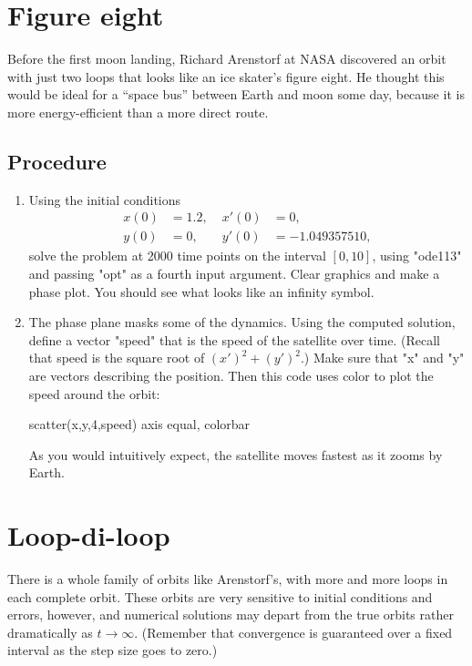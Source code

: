 \documentclass[11pt,twoside]{article}
\begin{document}
\section{Figure eight}

Before the first moon landing, Richard Arenstorf at NASA discovered an orbit with just two loops that looks like an ice skater's figure eight. He thought this would be ideal for a ``space bus'' between Earth and moon some day, because it is more energy-efficient than a more direct route. 

\subsection*{Procedure}

\begin{enumerate}
 \item Using the initial conditions 
  \begin{align*}
    x(0) &= 1.2, \; & x'(0) &= 0, \\
    y(0) &= 0, \; & y'(0) &= -1.049357510,
  \end{align*}
  solve the problem at 2000 time points on the interval $[0,10]$, using "ode113" and passing "opt" as a fourth input argument. Clear graphics and make a phase plot. You should see what looks like an infinity symbol.
  \item The phase plane masks some of the dynamics. Using the computed solution, define a vector "speed" that is the speed of the satellite over time. (Recall that speed is the square root of $(x')^2+(y')^2$.) Make sure that "x" and "y" are vectors describing the position. Then this code uses color to plot the speed around the orbit:
  \begin{matlab}
  scatter(x,y,4,speed)
  axis equal, colorbar
  \end{matlab}
  As you would intuitively expect, the satellite moves fastest as it zooms by Earth. 
\end{enumerate}


\section{Loop-di-loop}

There is a whole family of orbits like Arenstorf's, with more and more loops in each complete orbit. These orbits are very sensitive to initial conditions and errors, however, and numerical solutions may depart from the true orbits rather dramatically as $t\to\infty$. (Remember that convergence is guaranteed over a fixed interval as the step size goes to zero.)
\end{document}
